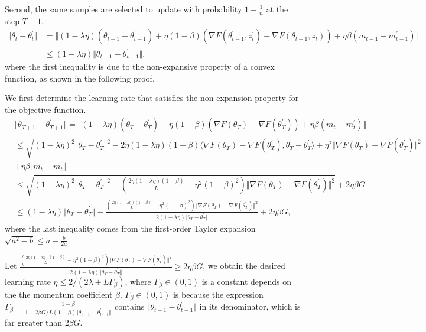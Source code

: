 Second, the same samples are selected to update with probability $1-\frac{1}{n}$ at the step $T+1$. 
 \begin{equation}
  \begin{aligned}
   \Vert \theta_t -\theta_t^{\prime} \Vert &= \Vert (1-\lambda \eta) (\theta_{t-1} - \theta_{t-1}^{\prime}) + \eta (1-\beta)(\nabla F(\theta_{t-1}^{\prime},z_{t}^{\prime}) - \nabla F(\theta_{t-1},z_{t})) + \eta \beta(m_{t-1} - m_{t-1}^{\prime})\Vert\\
    &\leq (1-\lambda \eta)\Vert\theta_{t-1} - \theta_{t-1}^{\prime}\Vert,
  \end{aligned}
 \end{equation}
where the first inequality is due to the non-expansive property of a convex function, as shown in the following proof.

We first determine the learning rate that satisfies the non-expansion property for the objective function.
\begin{equation}\label{eq:app2.3}
     \begin{aligned}
      &\Vert \theta_{T+1} - \theta_{T+1}^{\prime}\Vert = \Vert (1-\lambda\eta)(\theta_{T}-\theta_{T}^{\prime}) + \eta(1-\beta) (\nabla F(\theta_{T})-\nabla F(\theta_{T}^{\prime}))
      +\eta\beta(m_t-m_t^{\prime})\Vert  \\
      &\leq \sqrt{(1-\lambda\eta)^2\Vert \theta_{T} - \theta_{T}^{\prime} \Vert^2 - 2\eta (1-\lambda\eta)(1-\beta)\langle \nabla F(\theta_{T}) -\nabla F(\theta_{T}^{\prime}), \theta_T- \theta_T^{\prime} \rangle +\eta^2 \Vert \nabla F(\theta_{T}) - \nabla F(\theta_{T}^{\prime})\Vert^2}\\& + \eta\beta\Vert m_t-m_t^{\prime}\Vert\\
      &\leq \sqrt{(1-\lambda\eta)^2\Vert \theta_T- \theta_T^{\prime}\Vert^2 - \left(\frac{2\eta (1-\lambda\eta)(1-\beta)}{L} -\eta^2(1-\beta)^2 \right) \Vert \nabla F(\theta_{T}) -\nabla F(\theta_{T}^{\prime})\Vert^2} + 2\eta\beta G \\
      &\leq (1-\lambda\eta)\Vert \theta_T- \theta_T^{\prime}\Vert - \frac{\left(\frac{2\eta (1-\lambda\eta)(1-\beta)}{L} -\eta^2(1-\beta)^2 \right) \Vert \nabla F(\theta_{T}) -\nabla F(\theta_{T}^{\prime})\Vert^2}{2(1-\lambda\eta)\Vert \theta_T- \theta_T^{\prime}\Vert} + 2\eta\beta G,
     \end{aligned}
\end{equation}
where the last inequality comes from the first-order Taylor expansion $\sqrt{a^2-b}\leq a-\frac{b}{2a}$. 

Let $\frac{\left(\frac{2\eta (1-\lambda\eta)(1-\beta)}{L} -\eta^2(1-\beta)^2 \right) \Vert \nabla F(\theta_{T}) -\nabla F(\theta_{T}^{\prime})\Vert^2}{2(1-\lambda\eta)\Vert \theta_T- \theta_T^{\prime}\Vert} \geq  2\eta\beta G$, we obtain the desired learning rate $\eta \leq 2/(2\lambda+L\Gamma_{\beta})$, where $\Gamma_{\beta}\in(0,1)$ is a constant depends on the the momentum coefficient $\beta$. $\Gamma_{\beta}\in(0,1)$ is because the expression $\Gamma_{\beta}=\frac{1-\beta}{1-2\beta G/L(1-\beta)\Vert\theta_{t-1}-\theta_{t-1}^{\prime}\Vert}$ contains $\Vert\theta_{t-1}-\theta_{t-1}^{\prime}\Vert$ in its denominator, which is far greater than $2\beta G$. 

